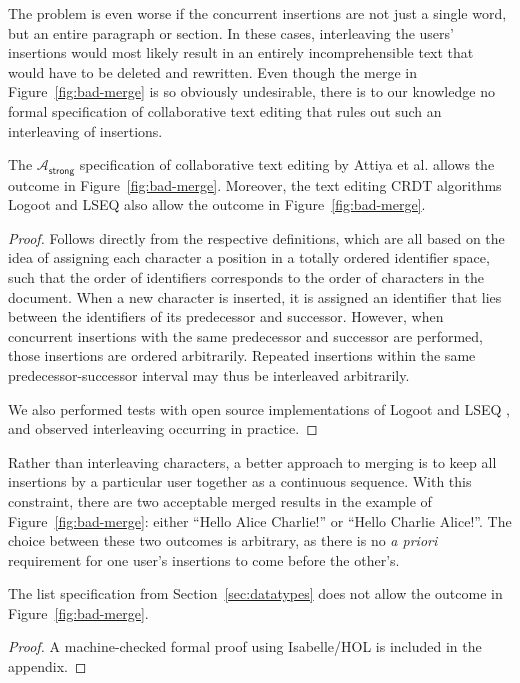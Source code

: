 The problem is even worse if the concurrent insertions are not just a single word, but an entire paragraph or section.
In these cases, interleaving the users' insertions would most likely result in an entirely incomprehensible text that would have to be deleted and rewritten.
Even though the merge in Figure~\ref{fig:bad-merge} is so obviously undesirable, there is to our knowledge no formal specification of collaborative text editing that rules out such an interleaving of insertions.

\begin{proposition}\label{prop:attiya-allows-interleaving}
    The $\mathcal{A}_\textsf{strong}$ specification of collaborative text editing by Attiya et al. \cite{Attiya:2016kh} allows the outcome in Figure~\ref{fig:bad-merge}.
    Moreover, the text editing CRDT algorithms Logoot \cite{Weiss:2009ht,Weiss:2010hx} and LSEQ \cite{Nedelec:2013ky,Nedelec:2016eo} also allow the outcome in Figure~\ref{fig:bad-merge}.
\end{proposition}
\begin{proof}
    Follows directly from the respective definitions, which are all based on the idea of assigning each character a position in a totally ordered identifier space, such that the order of identifiers corresponds to the order of characters in the document.
    When a new character is inserted, it is assigned an identifier that lies between the identifiers of its predecessor and successor.
    However, when concurrent insertions with the same predecessor and successor are performed, those insertions are ordered arbitrarily.
    Repeated insertions within the same predecessor-successor interval may thus be interleaved arbitrarily.

    We also performed tests with open source implementations of Logoot \cite{AhmedNacer:2011ke,ReplicationBenchmark} and LSEQ \cite{LSEQTree,Nedelec:2016eo}, and observed interleaving occurring in practice.
\end{proof}

Rather than interleaving characters, a better approach to merging is to keep all insertions by a particular user together as a continuous sequence.
With this constraint, there are two acceptable merged results in the example of Figure~\ref{fig:bad-merge}: either ``Hello Alice Charlie!'' or ``Hello Charlie Alice!''.
The choice between these two outcomes is arbitrary, as there is no \emph{a priori} requirement for one user's insertions to come before the other's.

\begin{proposition}\label{prop:no-interleaving}
    The list specification from Section~\ref{sec:datatypes} does not allow the outcome in Figure~\ref{fig:bad-merge}.
\end{proposition}
\begin{proof}
    A machine-checked formal proof using Isabelle/HOL is included in the appendix.
\end{proof}

